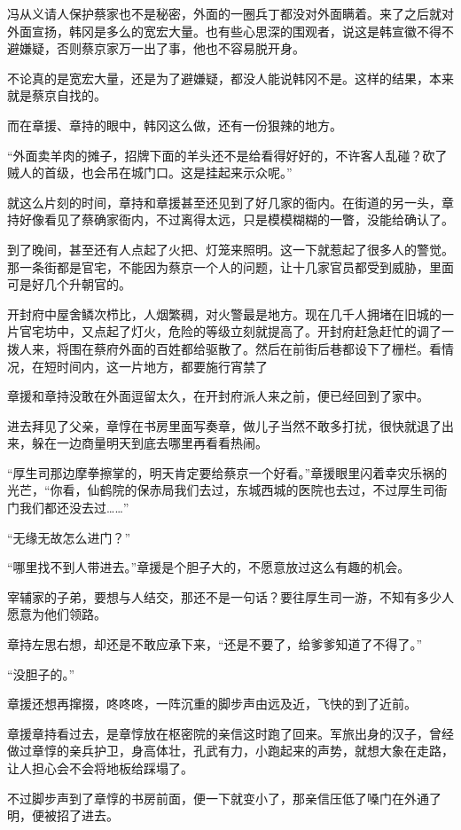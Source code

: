 冯从义请人保护蔡家也不是秘密，外面的一圈兵丁都没对外面瞒着。来了之后就对外面宣扬，韩冈是多么的宽宏大量。也有些心思深的围观者，说这是韩宣徽不得不避嫌疑，否则蔡京家万一出了事，他也不容易脱开身。

不论真的是宽宏大量，还是为了避嫌疑，都没人能说韩冈不是。这样的结果，本来就是蔡京自找的。

而在章援、章持的眼中，韩冈这么做，还有一份狠辣的地方。

“外面卖羊肉的摊子，招牌下面的羊头还不是给看得好好的，不许客人乱碰？砍了贼人的首级，也会吊在城门口。这是挂起来示众呢。”

就这么片刻的时间，章持和章援甚至还见到了好几家的衙内。在街道的另一头，章持好像看见了蔡确家衙内，不过离得太远，只是模模糊糊的一瞥，没能给确认了。

到了晚间，甚至还有人点起了火把、灯笼来照明。这一下就惹起了很多人的警觉。那一条街都是官宅，不能因为蔡京一个人的问题，让十几家官员都受到威胁，里面可是好几个升朝官的。

开封府中屋舍鳞次栉比，人烟繁稠，对火警最是地方。现在几千人拥堵在旧城的一片官宅坊中，又点起了灯火，危险的等级立刻就提高了。开封府赶急赶忙的调了一拨人来，将围在蔡府外面的百姓都给驱散了。然后在前街后巷都设下了栅栏。看情况，在短时间内，这一片地方，都要施行宵禁了

章援和章持没敢在外面逗留太久，在开封府派人来之前，便已经回到了家中。

进去拜见了父亲，章惇在书房里面写奏章，做儿子当然不敢多打扰，很快就退了出来，躲在一边商量明天到底去哪里再看看热闹。

“厚生司那边摩拳擦掌的，明天肯定要给蔡京一个好看。”章援眼里闪着幸灾乐祸的光芒，“你看，仙鹤院的保赤局我们去过，东城西城的医院也去过，不过厚生司衙门我们都还没去过……”

“无缘无故怎么进门？”

“哪里找不到人带进去。”章援是个胆子大的，不愿意放过这么有趣的机会。

宰辅家的子弟，要想与人结交，那还不是一句话？要往厚生司一游，不知有多少人愿意为他们领路。

章持左思右想，却还是不敢应承下来，“还是不要了，给爹爹知道了不得了。”

“没胆子的。”

章援还想再撺掇，咚咚咚，一阵沉重的脚步声由远及近，飞快的到了近前。

章援章持看过去，是章惇放在枢密院的亲信这时跑了回来。军旅出身的汉子，曾经做过章惇的亲兵护卫，身高体壮，孔武有力，小跑起来的声势，就想大象在走路，让人担心会不会将地板给踩塌了。

不过脚步声到了章惇的书房前面，便一下就变小了，那亲信压低了嗓门在外通了明，便被招了进去。

